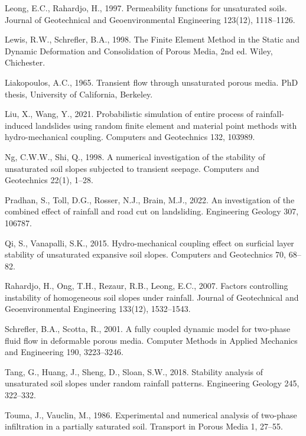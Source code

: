 Leong, E.C., Rahardjo, H., 1997. Permeability functions for unsaturated soils. Journal of Geotechnical and
Geoenvironmental Engineering 123(12), 1118--1126.

Lewis, R.W., Schrefler, B.A., 1998. The Finite Element Method in the Static and Dynamic Deformation and
Consolidation of Porous Media, 2nd ed. Wiley, Chichester.

Liakopoulos, A.C., 1965. Transient flow through unsaturated porous media. PhD thesis, University of California,
Berkeley.

Liu, X., Wang, Y., 2021. Probabilistic simulation of entire process of rainfall-induced landslides using random
finite element and material point methods with hydro-mechanical coupling. Computers and Geotechnics 132, 103989.

Ng, C.W.W., Shi, Q., 1998. A numerical investigation of the stability of unsaturated soil slopes subjected to
transient seepage. Computers and Geotechnics 22(1), 1--28.

Pradhan, S., Toll, D.G., Rosser, N.J., Brain, M.J., 2022. An investigation of the combined effect of rainfall and
road cut on landsliding. Engineering Geology 307, 106787.

Qi, S., Vanapalli, S.K., 2015. Hydro-mechanical coupling effect on surficial layer stability of unsaturated
expansive soil slopes. Computers and Geotechnics 70, 68--82. %

Rahardjo, H., Ong, T.H., Rezaur, R.B., Leong, E.C., 2007. Factors controlling instability of homogeneous soil slopes
under rainfall. Journal of Geotechnical and Geoenvironmental Engineering 133(12), 1532--1543.

Schrefler, B.A., Scotta, R., 2001. A fully coupled dynamic model for two-phase fluid flow in deformable porous media.
Computer Methods in Applied Mechanics and Engineering 190, 3223--3246.

Tang, G., Huang, J., Sheng, D., Sloan, S.W., 2018. Stability analysis of unsaturated soil slopes under random
rainfall patterns. Engineering Geology 245, 322--332.

Touma, J., Vauclin, M., 1986. Experimental and numerical analysis of two-phase infiltration in a partially saturated
soil. Transport in Porous Media 1, 27--55.

